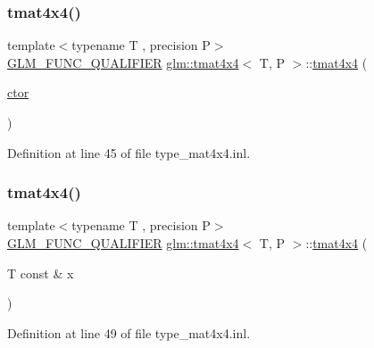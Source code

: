 \subsubsection{\texorpdfstring{tmat4x4()}{tmat4x4()}\hspace{0.1cm}{\footnotesize\ttfamily [4/22]}}
{\footnotesize\ttfamily template$<$typename T , precision P$>$ \\
\mbox{\hyperlink{setup_8hpp_a33fdea6f91c5f834105f7415e2a64407}{G\+L\+M\+\_\+\+F\+U\+N\+C\+\_\+\+Q\+U\+A\+L\+I\+F\+I\+ER}} \mbox{\hyperlink{structglm_1_1tmat4x4}{glm\+::tmat4x4}}$<$ T, P $>$\+::\mbox{\hyperlink{structglm_1_1tmat4x4}{tmat4x4}} (\begin{DoxyParamCaption}\item[{\mbox{\hyperlink{namespaceglm_a807df837905ec286f806a536af03b57f}{ctor}}}]{ }\end{DoxyParamCaption})\hspace{0.3cm}{\ttfamily [explicit]}}



Definition at line 45 of file type\+\_\+mat4x4.\+inl.

\mbox{\label{structglm_1_1tmat4x4_a298fc842de48d9243b3913dd1bdcfeb0}} 
\subsubsection{\texorpdfstring{tmat4x4()}{tmat4x4()}\hspace{0.1cm}{\footnotesize\ttfamily [5/22]}}
{\footnotesize\ttfamily template$<$typename T , precision P$>$ \\
\mbox{\hyperlink{setup_8hpp_a33fdea6f91c5f834105f7415e2a64407}{G\+L\+M\+\_\+\+F\+U\+N\+C\+\_\+\+Q\+U\+A\+L\+I\+F\+I\+ER}} \mbox{\hyperlink{structglm_1_1tmat4x4}{glm\+::tmat4x4}}$<$ T, P $>$\+::\mbox{\hyperlink{structglm_1_1tmat4x4}{tmat4x4}} (\begin{DoxyParamCaption}\item[{T const \&}]{x }\end{DoxyParamCaption})\hspace{0.3cm}{\ttfamily [explicit]}}



Definition at line 49 of file type\+\_\+mat4x4.\+inl.

\mbox{\label{structglm_1_1tmat4x4_a8a004f9878532de00a3cb1aa22a4f154}} 
